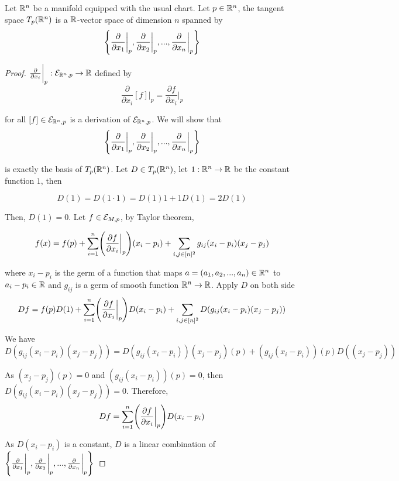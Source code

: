 \begin{proposition}
	Let $\R^n$ be a manifold equipped with the usual chart. Let $p \in \R^n$, the tangent space $T_p(\R^n)$ is a $\R$-vector space of dimension $n$ spanned by
	$$
	\set*{\frac{\partial}{\partial x_1}\bigg\vert_p, \frac{\partial}{\partial x_2}\bigg\vert_p, ..., \frac{\partial}{\partial x_n}\bigg\vert_p}
	$$
	\begin{proof}
		$\frac{\partial}{\partial x_i} \bigg\vert_p: \E_{\R^n, p} \to \R$ defined by
		$$
		\frac{\partial}{\partial x_i}[f] \bigg\vert_p = \frac{\partial f}{\partial x_i} \bigg\vert_p
		$$
		
		for all $[f] \in \E_{\R^n, p}$ is a derivation of $\E_{\R^n, p}$. We will show that 
		$$
		\set*{\frac{\partial}{\partial x_1}\bigg\vert_p, \frac{\partial}{\partial x_2}\bigg\vert_p, ..., \frac{\partial}{\partial x_n}\bigg\vert_p}
		$$
		
		is exactly the basis of $T_p(\R^n)$. Let $D \in T_p(\R^n)$, let $1: \R^n \to \R$ be the constant function $1$, then
		
		$$
		D(1) = D(1 \cdot 1) = D(1) 1 + 1 D(1) = 2 D(1)
		$$
		
		Then, $D(1) = 0$. Let $f \in \E_{M, p}$, by Taylor theorem,
		
		$$
		f(x) = f(p) + \sum_{i=1}^n \tuple*{\frac{\partial f}{\partial x_i} \bigg\vert_p}(x_i - p_i) + \sum_{i, j \in [n]^2} g_{ij}(x_i - p_i)(x_j - p_j)
		$$
		
		where $x_i - p_i$ is the germ of a function that maps $a = (a_1, a_2, ..., a_n) \in \R^n$ to $a_i - p_i \in \R$ and $g_{ij}$ is a germ of smooth function $\R^n \to \R$. Apply $D$ on both side
		$$
		Df = f(p) D(1) + \sum_{i=1}^n \tuple*{\frac{\partial f}{\partial x_i} \bigg\vert_p} D(x_i - p_i) + \sum_{i, j \in [n]^2} D(g_{ij}(x_i - p_i)(x_j - p_j))
		$$
		
		We have
		$$
		D(g_{ij}(x_i - p_i)(x_j - p_j)) = D(g_{ij}(x_i - p_i))(x_j - p_j)(p) + (g_{ij}(x_i - p_i))(p)D((x_j - p_j))
		$$
		
		As $(x_j - p_j)(p) = 0$ and $(g_{ij}(x_i - p_i))(p) = 0$, then $D(g_{ij}(x_i - p_i)(x_j - p_j)) = 0$. Therefore,
		$$
		Df = \sum_{i=1}^n \tuple*{\frac{\partial f}{\partial x_i} \bigg\vert_p} D(x_i - p_i)
		$$
		
		As $D(x_i - p_i)$ is a constant, $D$ is a linear combination of $\set*{\frac{\partial}{\partial x_1}\bigg\vert_p, \frac{\partial}{\partial x_2}\bigg\vert_p, ..., \frac{\partial}{\partial x_n}\bigg\vert_p}$
		
	\end{proof}
\end{proposition}

